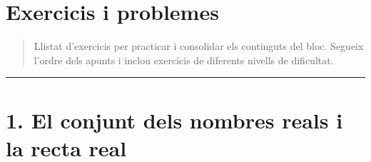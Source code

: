 \documentclass[13pt,a4paper]{extarticle}
\begin{document}
\section*{Exercicis i problemes}

\begin{quote}\small Llistat d'exercicis per practicar i consolidar els continguts del bloc. Segueix l'ordre dels apunts i inclou exercicis de diferents nivells de dificultat.\end{quote}


\vspace{1mm}\hrule\vspace{3mm}

\section*{1. El conjunt dels nombres reals i la recta real}
\end{document}
